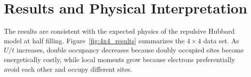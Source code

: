 \documentclass[9pt,a4paper,twocolumn,twoside]{rho-class/rho}
\begin{document}




\section{Results and Physical Interpretation}

The results are consistent with the expected physics of the repulsive Hubbard model at half filling. Figure~\ref{fig:4x4_results} summarizes the $4\times4$ data set. As $U/t$ increases, double occupancy decreases because doubly occupied sites become energetically costly, while local moments grow because electrons preferentially avoid each other and occupy different sites.
\end{document}
